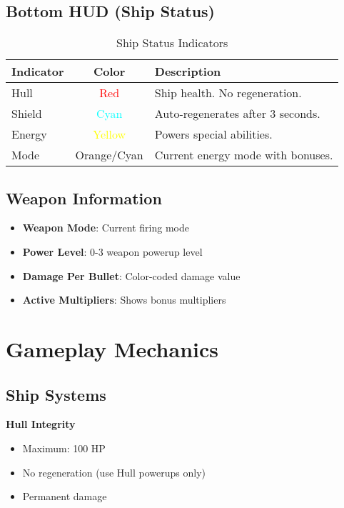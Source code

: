 \documentclass[11pt,a4paper]{article}
\begin{document}
\subsection{Bottom HUD (Ship Status)}

\begin{table}[h]
\centering
\begin{tabularx}{\textwidth}{|l|c|X|}
\hline
\rowcolor{primarycolor!20}
\textbf{Indicator} & \textbf{Color} & \textbf{Description} \\
\hline
Hull & \textcolor{red}{Red} & Ship health. No regeneration. \\
\hline
Shield & \textcolor{cyan}{Cyan} & Auto-regenerates after 3 seconds. \\
\hline
Energy & \textcolor{yellow}{Yellow} & Powers special abilities. \\
\hline
Mode & Orange/Cyan & Current energy mode with bonuses. \\
\hline
\end{tabularx}
\caption{Ship Status Indicators}
\end{table}

\subsection{Weapon Information}
\begin{itemize}
    \item \textbf{Weapon Mode}: Current firing mode
    \item \textbf{Power Level}: 0-3 weapon powerup level
    \item \textbf{Damage Per Bullet}: Color-coded damage value
    \item \textbf{Active Multipliers}: Shows bonus multipliers
\end{itemize}

\section{Gameplay Mechanics}

\subsection{Ship Systems}

\textbf{Hull Integrity}
\begin{itemize}
    \item Maximum: 100 HP
    \item No regeneration (use Hull powerups only)
    \item Permanent damage
\end{itemize}
\end{document}
